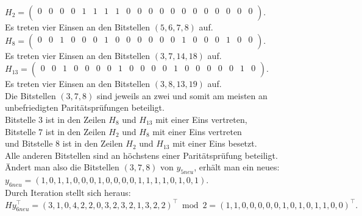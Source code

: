 \begin{Beispiel}
    $H_2= \left( \begin{array}{rrrrrrrrrrrrrrrrrrrr}
        0 & 0 & 0 & 0 & 1 & 1 & 1 & 1 & 0 & 0 & 0 & 0 & 0 & 0 & 0 & 0 & 0 & 0 & 0 & 0 \\
       \end{array}\right). 
    $\\
    Es treten vier Einsen an den Bitstellen $(5, 6, 7, 8)$ auf.\\
    
    $H_8=\left( \begin{array}{rrrrrrrrrrrrrrrrrrrr}
        0 & 0 & 1 & 0 & 0 & 0 & 1 & 0 & 0 & 0 & 0 & 0 & 0 & 1 & 0 & 0 & 0 & 1 & 0 & 0 \\
       \end{array}\right). 
    $\\
    Es treten vier Einsen an den Bitstellen $(3, 7, 14, 18)$ auf.\\
    
    $H_{13}= \left( \begin{array}{rrrrrrrrrrrrrrrrrrrr}
        0 & 0 & 1 & 0 & 0 & 0 & 0 & 1 & 0 & 0 & 0 & 0 & 1 & 0 & 0 & 0 & 0 & 0 & 1 & 0 \\
       \end{array}\right). 
    $\\
    Es treten vier Einsen an den Bitstellen $(3, 8, 13, 19)$ auf.\\
    
    Die Bitstellen $(3, 7, 8)$ sind jeweils an zwei und somit am meisten an unbefriedigten Paritätsprüfungen beteiligt.\\
    Bitstelle $3$ ist in den Zeilen $H_8$ und $H_{13}$ mit einer Eins vertreten,\\
    Bitstelle $7$ ist in den Zeilen $H_2$ und $H_8$ mit einer Eins vertreten\\
    und Bitstelle $8$ ist in den Zeilen $H_2$ und $H_{13}$ mit einer Eins besetzt.\\
    Alle anderen Bitstellen sind an höchstens einer Paritätsprüfung beteiligt.\\
    
    Ändert man also die Bitstellen $(3, 7, 8)$ von $y_{5neu}$, erhält man ein neues:\\
    $y_{6neu} = (1,0,1,1,0,0,0,1,0,0,0,0,1,1,1,1,0,1,0,1).$\\
    
    Durch Iteration stellt sich heraus:\\
    $Hy_{6neu}^\intercal= (3,1,0,4,2,2,0,3,2,3,2,1,3,2,2)^\intercal \bmod 2= (1,1,0,0,0,0,0,1,0,1,0,1,1,0,0)^\intercal.$\\
    

\end{Beispiel}
